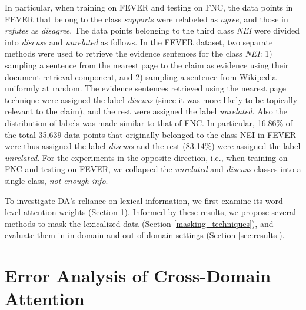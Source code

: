 \documentclass[11pt,a4paper]{article}
\begin{document}
In particular, when training on FEVER and testing on FNC, the data points in FEVER that belong to the class \textit{supports} were relabeled as \textit{agree}, and those in \textit{refutes} as \textit{disagree}. The data points belonging to the third class \textit{NEI} were divided into \textit{discuss} and \textit{unrelated} as follows.
In the FEVER dataset, two separate methods were used to retrieve the evidence sentences for the class \textit{NEI}: 1) sampling a sentence from the nearest page to the claim as evidence using their document retrieval component, and 2) sampling a sentence from Wikipedia uniformly at random. The evidence sentences retrieved using the nearest page technique were assigned the label \textit{discuss} (since it was more likely to be topically relevant to the claim), and the rest were assigned the label \textit{unrelated}. Also the distribution of labels was made similar to that of FNC. In particular, 16.86\% of the total 35,639 data points that originally belonged to the class NEI in FEVER were thus assigned the label \textit{discuss} and the rest (83.14\%) were assigned the label \textit{unrelated}. For the experiments in the opposite direction, i.e., when training on FNC and testing on FEVER, we collapsed the \textit{unrelated} and \textit{discuss} classes into a single class, \textit{not enough info}.


To investigate DA's reliance on lexical information, we first examine its word-level attention weights (Section \ref{attention_analysis}). 
Informed by these results, we propose several methods to mask the lexicalized data (Section \ref{masking_techniques}), and evaluate them in in-domain and  out-of-domain settings (Section \ref{sec:results}).



\section{Error Analysis of Cross-Domain Attention} \label{attention_analysis}
\end{document}
